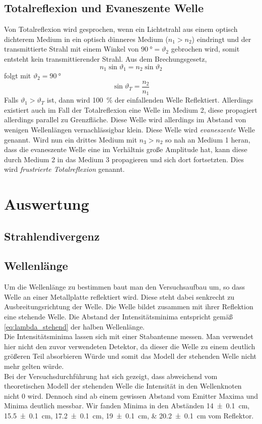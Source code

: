 \subsection{Totalreflexion und Evaneszente Welle}
Von Totalreflexion wird gesprochen, wenn ein Lichtstrahl aus einem optisch dichterem Medium in ein optisch dünneres Medium ($ n_{1}>n_{2} $) eindringt und der transmittierte Strahl mit einem Winkel von $ \SI{90}{\degree} = \vartheta_{2} $ gebrochen wird, somit entsteht kein transmittierender Strahl.
Aus dem Brechungsgesetz,
\begin{equation}
n_{1}\sin \vartheta_{1}=n_{2}\sin\vartheta_{2}
\end{equation}
folgt mit $ \vartheta_{2}=\SI{90}{\degree} $
\begin{equation}
\sin\vartheta_{T}=\frac{n_{2}}{n_{1}}
\end{equation}
Falls $ \vartheta_{1}>\vartheta_{T} $ ist, dann wird \SI{100}{\percent} der einfallenden Welle Reflektiert.
Allerdings existiert auch im Fall der Totalreflexion eine Welle im Medium 2, diese propagiert allerdings parallel zu Grenzfläche. Diese Welle wird allerdings im Abstand von wenigen Wellenlängen vernachlässigbar klein. Diese Welle wird \textit{evaneszente} Welle genannt.
Wird nun ein drittes Medium mit $ n_{3}>n_{2} $ so nah an Medium 1 heran, dass die evaneszente Welle eine im Verhältnis große Amplitude hat, kann diese durch Medium 2 in das Medium 3 propagieren und sich dort fortsetzten. Dies wird \textit{frustrierte Totalreflexion} genannt.

\newpage
\section{Auswertung}

\subsection{Strahlendivergenz}
\subsection{Wellenlänge}
Um die Wellenlänge zu bestimmen baut man den Versuchsaufbau um, so dass Welle an einer Metallplatte reflektiert wird. Diese steht dabei senkrecht zu Ausbreitungsrichtung der Welle. Die Welle bildet zusammen mit ihrer Reflektion eine stehende Welle. Die Abstand der Intensitätsminima entspricht gemäß \eqref{eq:lambda_stehend} der halben Wellenlänge. \\
Die Intensitätsminima lassen sich mit einer Stabantenne messen. Man verwendet hier nicht den zuvor verwendeten Detektor, da dieser die Welle zu einem deutlich größeren Teil absorbieren Würde und somit das Modell der stehenden Welle nicht mehr gelten würde. \\
Bei der Versuchsdurchführung hat sich gezeigt, dass abweichend vom theoretischen Modell der stehenden Welle die Intensität in den Wellenknoten nicht $ 0 $ wird. Dennoch sind ab einem gewissen Abstand vom Emitter Maxima und Minima deutlich messbar. Wir fanden Minima in den Abständen \SIlist{14+-.1; 15,5+-.1; 17,2+-.1; 19+-.1; 20,2+-.1}{\centi\meter} vom Reflektor.
